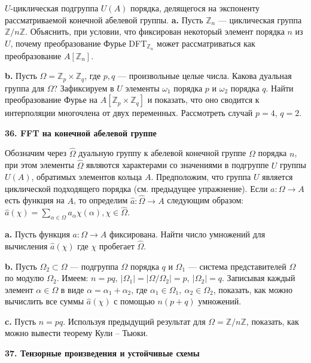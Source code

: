 \documentclass{mai_book}
\begin{document}
\medskip
$U$-циклическая подгруппа $U(A)$ порядка, делящегося на экспоненту рассматриваемой конечной абелевой группы.\newpage
\textbf{a.} Пусть $\mathbb{Z}_n$ --- циклическая группа $\mathbb{Z}/n \mathbb{Z}$. Объяснить, при условии, что фиксирован некоторый элемент порядка $n$ из $U$, почему преобразование Фурье D{\footnotesize FT}$_{\mathbb{Z}_{n}}$ может рассматриваться как преобразование $A [\mathbb{Z}_n]$.\par 
\textbf{b.} Пусть $\Omega = \mathbb{Z}_p \times \mathbb{Z}_q$, где $p,q$ --- произвольные целые числа. Какова дуальная группа для $\Omega$? Зафиксируем в $U$ элементы $\omega_1$ порядка $p$ и $\omega_2$ порядка $q$. Найти преобразование Фурье на $A[\mathbb{Z}_p \times \mathbb{Z}_q]$ и показать, что оно сводится к интерполяции многочлена от двух переменных. Рассмотреть случай $p=4$, $q=2$.

\medskip
\noindent
\textbf{36. F{\footnotesize FT} на конечной абелевой группе}

\medskip
Обозначим через $\hat{\Omega}$ дуальную группу к абелевой конечной группе $\Omega$ порядка $n$, при этом элементы $\hat{\Omega}$ являются характерами со значениями в подгруппе $U$ группы $U(A)$, обратимых элементов кольца $A$. Предположим, что группа $U$ является циклической подходящего порядка (см. предыдущее упражнение). Если $a: \Omega \to A$ есть функция на $A$, то определим $\hat{a}: \hat{\Omega} \to A$ следующим образом: $\hat{a}(\chi)= \sum\nolimits_{\alpha \in \Omega} a_{\alpha}\chi(\alpha), \chi \in \hat{\Omega}.$\par 
\textbf{a.} Пусть функция $a: \Omega \to A$ фиксирована. Найти число умножений для вычисления $\hat{a}(\chi)$ где $\chi$ пробегает $\hat{\Omega}$.\par 
\textbf{b.} Пусть $\Omega_2 \subset \Omega$ --- подгруппа $\Omega$ порядка $q$ и $\Omega_1$ --- система представителей $\Omega$ по модулю $\Omega_2$. Имеем: $n=pq,\ | \Omega_1 |=| \Omega / \Omega_2 |=p,\ | \Omega_2 | =q.$ Записывая каждый элемент $\alpha \in \Omega$ в виде $\alpha = \alpha_1 + \alpha_2$, где $\alpha_1 \in \Omega_1,\ \alpha_2 \in \Omega_2$, показать, как можно вычислить все суммы $\hat{a}(\chi)$ с помощью $n(p+q)$ умножений.\par 
\textbf{c.} Пусть $n=pq$. Используя предыдущий результат для $\Omega = \mathbb{Z}/n \mathbb{Z}$, показать, как можно вывести теорему Кули -- Тьюки.

\medskip
\noindent
\textbf{37. Тензорные произведения и устойчивые схемы}
\end{document}
